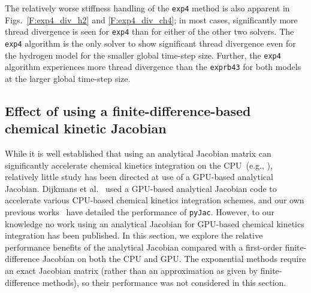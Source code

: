 \documentclass[preprint,review,11pt]{elsarticle}
\begin{document}
The relatively worse stiffness handling of the \texttt{exp4} method is also apparent in Figs.~\ref{F:exp4_div_h2} and \ref{F:exp4_div_ch4}; in most cases, significantly more thread divergence is seen for \texttt{exp4} than for either of the other two solvers.
The \texttt{exp4} algorithm is the only solver to show significant thread divergence even for the hydrogen model for the smaller global time-step size.
Further, the \texttt{exp4} algorithm experiences more thread divergence than the \texttt{exprb43} for both models at the larger global time-step size.

\subsection{Effect of using a finite-difference-based chemical kinetic Jacobian}

While it is well established that using an analytical Jacobian matrix can significantly accelerate chemical kinetics integration on the CPU~(e.g., \cite{Lu:2009gh,stone2014comparison,Schwer2002270}), relatively little study has been directed at use of a GPU-based analytical Jacobian.
Dijkmans et al.~\cite{Dijkmans:2014bb} used a GPU-based analytical Jacobian code to accelerate various CPU-based chemical kinetics integration schemes, and our own previous works~\cite{Niemeyer:2016aa,Niemeyer:2015ws} have detailed the performance of \texttt{pyJac}.
However, to our knowledge no work using an analytical Jacobian for GPU-based chemical kinetics integration has been published.
In this section, we explore the relative performance benefits of the analytical Jacobian compared with a first-order finite-difference Jacobian on both the CPU and GPU.
The exponential methods require an exact Jacobian matrix (rather than an approximation as given by finite-difference methods), so their performance was not considered in this section.
\end{document}
